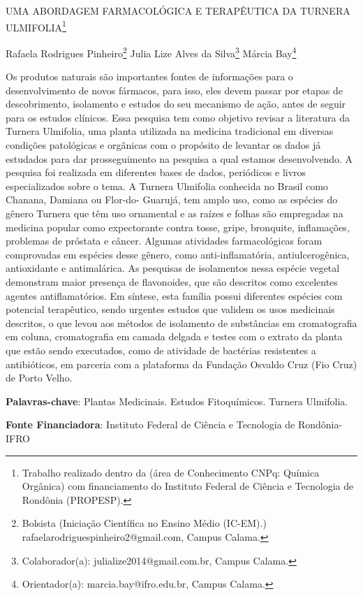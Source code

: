 \documentclass[article,12pt,onesidea,4paper,english,brazil]{abntex2}
\begin{document}
	
	
	\frenchspacing 
	
	\begin{center}
		\LARGE UMA ABORDAGEM FARMACOLÓGICA E TERAPÊUTICA DA TURNERA
		ULMIFOLIA\footnote{Trabalho realizado dentro da (área de Conhecimento CNPq:
			Química Orgânica) com financiamento do Instituto Federal de Ciência e Tecnologia de Rondônia
			(PROPESP).}
		
		\normalsize
	Rafaela Rodrigues Pinheiro\footnote{Bolsista (Iniciação Científica no Ensino Médio (IC-EM).) rafaelarodriguespinheiro2@gmail.com,
		Campus Calama.} 
	Julia Lize Alves da Silva\footnote{Colaborador(a): julialize2014@gmail.com.br, Campus Calama.} 
	Márcia Bay\footnote{Orientador(a): marcia.bay@ifro.edu.br, Campus Calama.} 
	\end{center}
	
	\noindent Os produtos naturais são importantes fontes de informações para o desenvolvimento
	de novos fármacos, para isso, eles devem passar por etapas de descobrimento,
	isolamento e estudos do seu mecanismo de ação, antes de seguir para os estudos
	clínicos. Essa pesquisa tem como objetivo revisar a literatura da Turnera Ulmifolia,
	uma planta utilizada na medicina tradicional em diversas condições patológicas e
	orgânicas com o propósito de levantar os dados já estudados para dar
	prosseguimento na pesquisa a qual estamos desenvolvendo. A pesquisa foi
	realizada em diferentes bases de dados, periódicos e livros especializados sobre o
	tema. A Turnera Ulmifolia conhecida no Brasil como Chanana, Damiana ou Flor-do-
	Guarujá, tem amplo uso, como as espécies do gênero Turnera que têm uso
	ornamental e as raízes e folhas são empregadas na medicina popular como
	expectorante contra tosse, gripe, bronquite, inflamações, problemas de próstata e
	câncer. Algumas atividades farmacológicas foram comprovadas em espécies desse
	gênero, como anti-inflamatória, antiulcerogênica, antioxidante e antimalárica. As
	pesquisas de isolamentos nessa espécie vegetal demonstram maior presença de
	flavonoides, que são descritos como excelentes agentes antiflamatórios. Em síntese,
	esta família possui diferentes espécies com potencial terapêutico, sendo urgentes
	estudos que validem os usos medicinais descritos, o que levou aos métodos de
	isolamento de substâncias em cromatografia em coluna, cromatografia em camada
	delgada e testes com o extrato da planta que estão sendo executados, como de
	atividade de bactérias resistentes a antibióticos, em parceria com a plataforma da
	Fundação Osvaldo Cruz (Fio Cruz) de Porto Velho.
	
	\vspace{\onelineskip}
	
	\noindent
	\textbf{Palavras-chave}: Plantas Medicinais. Estudos Fitoquímicos. Turnera Ulmifolia.
	
	\noindent
	\textbf{Fonte Financiadora}: Instituto Federal de Ciência e Tecnologia de Rondônia-
	IFRO
	
\end{document}
